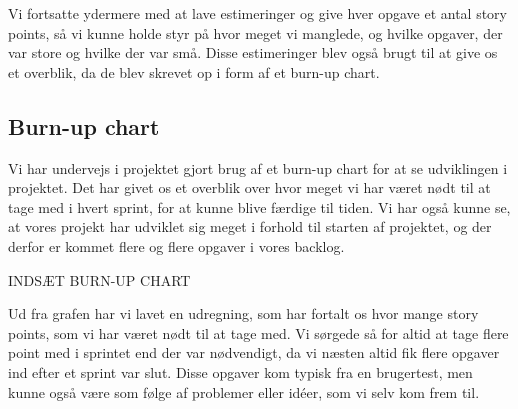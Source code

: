 Vi fortsatte ydermere med at lave estimeringer og give hver opgave et antal story points, så vi kunne holde styr på hvor meget vi manglede, og hvilke opgaver, der var store og hvilke der var små. Disse estimeringer blev også brugt til at give os et overblik, da de blev skrevet op i form af et burn-up chart.

\subsection{Burn-up chart}
Vi har undervejs i projektet gjort brug af et burn-up chart for at se udviklingen i projektet. Det har givet os et overblik over hvor meget vi har været nødt til at tage med i hvert sprint, for at kunne blive færdige til tiden. Vi har også kunne se, at vores projekt har udviklet sig meget i forhold til starten af projektet, og der derfor er kommet flere og flere opgaver i vores backlog.

INDSÆT BURN-UP CHART

Ud fra grafen har vi lavet en udregning, som har fortalt os hvor mange story points, som vi har været nødt til at tage med. Vi sørgede så for altid at tage flere point med i sprintet end der var nødvendigt, da vi næsten altid fik flere opgaver ind efter et sprint var slut. Disse opgaver kom typisk fra en brugertest, men kunne også være som følge af problemer eller idéer, som vi selv kom frem til.
